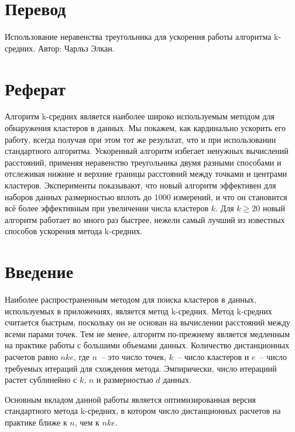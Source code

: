 \newpage
\setcounter{chapter}{0}
\chapter*{Перевод}
\vspace{-1ex}
\begin{center}
  Использование неравенства треугольника для ускорения работы алгоритма k-средних. Автор: Чарльз Элкан.
\end{center}

\vspace{-1.5em}
\chapter*{Реферат}
Алгоритм k-средних является наиболее широко используемым методом для обнаружения кластеров в данных. Мы покажем, как кардинально ускорить его работу, всегда получая при этом тот же результат, что и при использовании стандартного алгоритма. Ускоренный алгоритм избегает ненужных вычислений расстояний, применяя неравенство треугольника двумя разными способами и отслеживая нижние и верхние границы расстояний между точками и центрами кластеров. Эксперименты показывают, что новый алгоритм эффективен для наборов данных размерностью вплоть до 1000 измерений, и что он становится всё более эффективным при увеличении числа кластеров \( k \). Для \( k \ge 20 \) новый алгоритм работает во много раз быстрее, нежели самый лучший из известных способов ускорения метода k-средних.

\chapter{Введение}
Наиболее распространенным методом для поиска кластеров в данных, используемых в приложениях, является метод k-средних. Метод k-средних считается быстрым, поскольку он не основан на вычислении расстояний между всеми парами точек. Тем не менее, алгоритм по-прежнему является медленным на практике работы с большими объемами данных. Количество дистанционных расчетов равно \( nke \), где \( n \)~-- это число точек, \( k \)~-- число кластеров и \( e \)~-- число требуемых итераций для схождения метода. Эмпирически, число итерациий растет сублинейно с \( k \), \( n \) и размерностью \( d \) данных.

Основным вкладом данной работы является оптимизированная версия стандартного метода k-средних, в котором число дистанционных расчетов на практике ближе к \( n \), чем к \( nke \).

